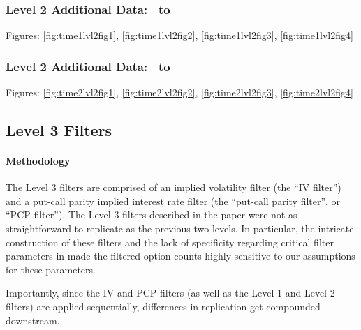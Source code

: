 \subsubsection{Level 2 Additional Data: \STARTONE\ to \ENDONE }
Figures: \autoref{fig:time1lvl2fig1}, \autoref{fig:time1lvl2fig2}, \autoref{fig:time1lvl2fig3}, \autoref{fig:time1lvl2fig4}

\subsubsection{Level 2 Additional Data: \STARTTWO\ to \ENDTWO }
Figures: \autoref{fig:time2lvl2fig1}, \autoref{fig:time2lvl2fig2}, \autoref{fig:time2lvl2fig3}, \autoref{fig:time2lvl2fig4}


\clearpage
\subsection{Level 3 Filters} 

\paragraph{Methodology}
The Level 3 filters are comprised of an implied volatility filter (the ``IV filter'') and a put-call parity implied interest rate filter (the ``put-call parity filter'', or ``PCP filter''). The Level 3 filters described in the paper were not as straightforward to replicate as the previous two levels. In particular, the intricate construction of these filters and the lack of specificity regarding critical filter parameters in \citet{constantinides2013} made the filtered option counts highly sensitive to our assumptions for these parameters. 

Importantly, since the IV and PCP filters (as well as the Level 1 and Level 2 filters) are applied sequentially, differences in replication get compounded downstream.

